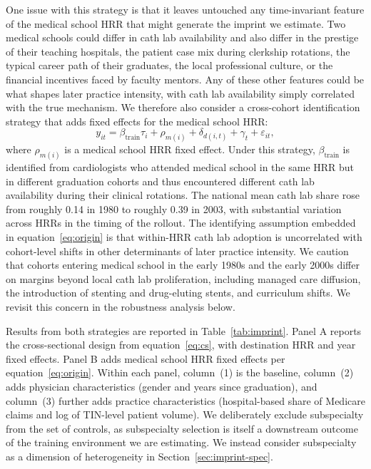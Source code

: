 \documentclass[12pt]{article}
\begin{document}
One issue with this strategy is that it leaves untouched any time-invariant feature of the medical school HRR that might generate the imprint we estimate. Two medical schools could differ in cath lab availability and also differ in the prestige of their teaching hospitals, the patient case mix during clerkship rotations, the typical career path of their graduates, the local professional culture, or the financial incentives faced by faculty mentors. Any of these other features could be what shapes later practice intensity, with cath lab availability simply correlated with the true mechanism. We therefore also consider a cross-cohort identification strategy that adds fixed effects for the medical school HRR:
\begin{equation}\label{eq:origin}
y_{it} = \beta_{\text{train}} \tau_{i} + \rho_{m(i)} + \delta_{d(i,t)} + \gamma_{t} + \varepsilon_{it},
\end{equation}
where $\rho_{m(i)}$ is a medical school HRR fixed effect. Under this strategy, $\beta_{\text{train}}$ is identified from cardiologists who attended medical school in the same HRR but in different graduation cohorts and thus encountered different cath lab availability during their clinical rotations. The national mean cath lab share rose from roughly 0.14 in 1980 to roughly 0.39 in 2003, with substantial variation across HRRs in the timing of the rollout. The identifying assumption embedded in equation~\eqref{eq:origin} is that within-HRR cath lab adoption is uncorrelated with cohort-level shifts in other determinants of later practice intensity. We caution that cohorts entering medical school in the early 1980s and the early 2000s differ on margins beyond local cath lab proliferation, including managed care diffusion, the introduction of stenting and drug-eluting stents, and curriculum shifts. We revisit this concern in the robustness analysis below.

Results from both strategies are reported in Table~\ref{tab:imprint}. Panel A reports the cross-sectional design from equation~\eqref{eq:cs}, with destination HRR and year fixed effects. Panel B adds medical school HRR fixed effects per equation~\eqref{eq:origin}. Within each panel, column~(1) is the baseline, column~(2) adds physician characteristics (gender and years since graduation), and column~(3) further adds practice characteristics (hospital-based share of Medicare claims and log of TIN-level patient volume). We deliberately exclude subspecialty from the set of controls, as subspecialty selection is itself a downstream outcome of the training environment we are estimating. We instead consider subspecialty as a dimension of heterogeneity in Section~\ref{sec:imprint-spec}.
\end{document}
